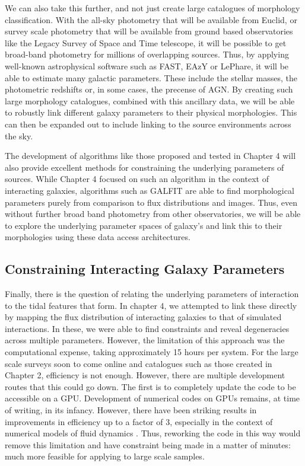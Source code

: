 We can also take this further, and not just create large catalogues of morphology classification. With the all-sky photometry that will be available from Euclid, or survey scale photometry that will be available from ground based observatories like the Legacy Survey of Space and Time telescope, it will be possible to get broad-band photometry for millions of overlapping sources. Thus, by applying well-known astrophysical software such as FAST, EAzY or LePhare, it will be able to estimate many galactic parameters. These include the stellar masses, the photometric redshifts or, in some cases, the precense of AGN. By creating such large morphology catalogues, combined with this ancillary data, we will be able to robustly link different galaxy parameters to their physical morphologies. This can then be expanded out to include linking to the source environments across the sky. 

The development of algorithms like those proposed and tested in Chapter 4 will also provide excellent methods for constraining the underlying parameters of sources. While Chapter 4 focused on such an algorithm in the context of interacting galaxies, algorithms such as GALFIT are able to find morphological parameters purely from comparison to flux distributions and images. Thus, even without further broad band photometry from other observatories, we will be able to explore the underlying parameter spaces of galaxy's and link this to their morphologies using these data access architectures. 

\subsection{Constraining Interacting Galaxy Parameters}
\noindent Finally, there is the question of relating the underlying parameters of interaction to the tidal features that form. In chapter 4, we attempted to link these directly by mapping the flux distribution of interacting galaxies to that of simulated interactions. In these, we were able to find constraints and reveal degeneracies across multiple parameters. However, the limitation of this approach was the computational expense, taking approximately 15 hours per system. For the large scale surveys soon to come online and catalogues such as those created in Chapter 2, efficiency is not enough. However, there are multiple development routes that this could go down. The first is to completely update the code to be accessible on a GPU. Development of numerical codes on GPUs remains, at time of writing, in its infancy. However, there have been striking results in improvements in efficiency up to a factor of 3, especially in the context of numerical models of fluid dynamics \citep{There tonnes of papers of GPUs on fluid codes}. Thus, reworking the code in this way would remove this limitation and have constraint being made in a matter of minutes: much more feasible for applying to large scale samples.

